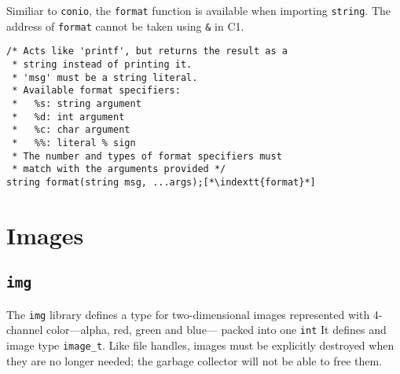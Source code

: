 \documentclass[11pt]{article}
\makeatletter
\newcommand{\indextt}[1]{\index{#1@\texttt{#1}}}
\makeatother
\begin{document}
Similiar to \lstinline'conio', the \lstinline'format' function
is available when importing \lstinline'string'.
The address of \lstinline'format' cannot be taken using \lstinline'&' in C1.
\begin{lstlisting}
/* Acts like 'printf', but returns the result as a
 * string instead of printing it.
 * 'msg' must be a string literal.
 * Available format specifiers:
 *   %s: string argument
 *   %d: int argument
 *   %c: char argument
 *   %%: literal % sign 
 * The number and types of format specifiers must
 * match with the arguments provided */
string format(string msg, ...args);[*\indextt{format}*]
\end{lstlisting}

\clearpage

\section{Images}

\subsection{\tt img}

The \lstinline'img' library defines a type for two-dimensional images
represented with 4-channel color---alpha, red, green and blue---
packed into one \lstinline'int'  It defines and image type \lstinline'image_t'.
Like file handles, images must be explicitly destroyed when they
are no longer needed; the garbage collector will not be able to
free them.
\end{document}
